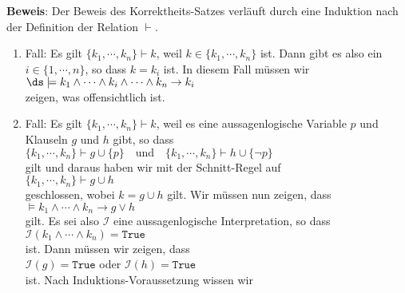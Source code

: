 \noindent
\textbf{Beweis}:  Der Beweis des Korrektheits-Satzes verläuft durch eine Induktion nach der Definition der Relation $\vdash$. 
\begin{enumerate}
\item Fall: Es gilt $\{ k_1, \cdots, k_n \} \vdash k$, weil $k \in \{ k_1, \cdots, k_n \}$ ist.  
      Dann gibt es also ein $i \in \{1,\cdots,n\}$, so dass $k = k_i$ ist.  In diesem Fall
      müssen wir
      \\[0.2cm]
      \hspace*{1.3cm}
      $\ds\models k_1 \wedge \cdots \wedge k_i \wedge \cdots \wedge k_n \rightarrow k_i$
      \\[0.2cm]
      zeigen, was offensichtlich ist.
\item Fall: Es gilt $\{ k_1, \cdots, k_n \} \vdash k$, weil es eine aussagenlogische
      Variable $p$ und Klauseln $g$ und $h$ gibt, so dass 
      \\[0.2cm]
      \hspace*{1.3cm}
      $\{ k_1, \cdots, k_n \} \vdash g \cup \{ p \} \quad \mathrm{und} \quad
         \{ k_1, \cdots, k_n \} \vdash h \cup \{ \neg p \}
      $
      \\[0.2cm]
      gilt und daraus haben wir mit der Schnitt-Regel auf
      \\[0.2cm]
      \hspace*{1.3cm}
      $\{ k_1, \cdots, k_n \} \vdash g \cup h$
      \\[0.2cm]
      geschlossen, wobei $k = g \cup h$ gilt.  Wir müssen nun zeigen, dass 
      \\[0.2cm]
      \hspace*{1.3cm}
      $\models k_1 \wedge \cdots \wedge k_n \rightarrow g \vee h$
      \\[0.2cm]
      gilt.  Es sei also $\mathcal{I}$ eine aussagenlogische Interpretation, so dass
      \\[0.2cm]
      \hspace*{1.3cm}
      $\mathcal{I}(k_1 \wedge \cdots \wedge k_n) = \texttt{True}$  
      \\[0.2cm]
      ist. Dann müssen wir zeigen, dass 
      \\[0.2cm]
      \hspace*{1.3cm}
      $\mathcal{I}(g) = \texttt{True}$ \quad oder \quad $\mathcal{I}(h) = \texttt{True}$
      \\[0.2cm]
      ist.  Nach Induktions-Voraussetzung wissen wir
      \\[0.2cm]
      \hspace*{1.3cm}

\end{enumerate}
